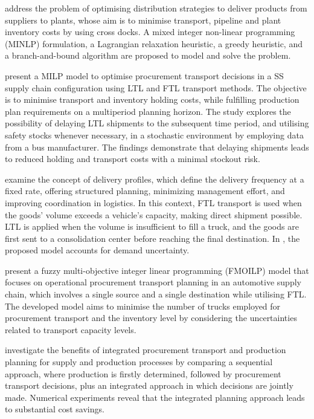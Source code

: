\autocite{Berman2006InboundCost} address the problem of optimising distribution strategies to deliver products from suppliers to plants, whose aim is to minimise transport, pipeline and plant inventory costs by using cross docks. A mixed integer non-linear programming (MINLP) formulation, a Lagrangian  relaxation heuristic,  a greedy heuristic, and a branch-and-bound algorithm are proposed to model and solve the problem.

\autocite{Sancak2011Multi-itemPolicy} present a MILP model to optimise procurement transport decisions in a SS supply chain configuration using LTL and FTL transport methods. The objective is to minimise transport and inventory holding costs, while fulfilling production plan requirements on a multiperiod planning horizon. The study explores the possibility of delaying LTL shipments to the subsequent time period, and utilising safety stocks whenever necessary, in a stochastic environment by employing data from a bus manufacturer. The findings demonstrate that delaying shipments leads to reduced holding and transport costs with a minimal stockout risk.


\autocite{Schoneberg2010AnNetworks} examine the concept of delivery profiles, which define the delivery frequency at a fixed rate, offering structured planning, minimizing management effort, and improving coordination in logistics. In this context, FTL transport is used when the goods' volume exceeds a vehicle's capacity, making direct shipment possible. LTL is applied when the volume is insufficient to fill a truck, and the goods are first sent to a consolidation center before reaching the final destination. In \autocite{Schoneberg2013ANetworks}, the proposed model accounts for demand uncertainty.

\autocite{Diaz-Madronero2014APlanning} present a  fuzzy  multi-objective  integer  linear programming (FMOILP) model that focuses on operational procurement transport planning in an automotive supply chain, which involves a single source and a single destination while utilising FTL. The developed model aims to minimise the number of trucks employed for procurement transport and the inventory level by considering the uncertainties related to transport capacity levels.

\autocite{Hein2016QuantitativeProblem} investigate the benefits of integrated procurement transport and production planning for supply and production processes by comparing a sequential approach, where production is firstly determined, followed by procurement transport decisions, plus an integrated approach in which decisions are jointly made. Numerical experiments reveal that the integrated planning approach leads to substantial cost savings.

